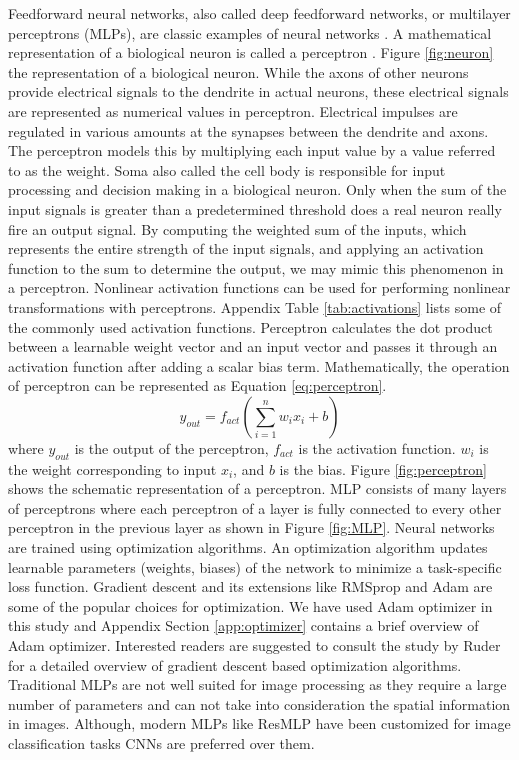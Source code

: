 Feedforward neural networks, also called deep feedforward networks, or multilayer perceptrons (MLPs), are classic examples of neural networks \cite{Goodfellow-et-al-2016}. A mathematical representation of a biological neuron is called a perceptron \cite{mcculloch1943logical}. Figure \ref{fig:neuron} the representation of a biological neuron. While the axons of other neurons provide electrical signals to the dendrite in actual neurons, these electrical signals are represented as numerical values in perceptron. Electrical impulses are regulated in various amounts at the synapses between the dendrite and axons. The perceptron models this by multiplying each input value by a value referred to as the weight. Soma also called the cell body is responsible for input processing and decision making in a biological neuron. Only when the sum of the input signals is greater than a predetermined threshold does a real neuron really fire an output signal. By computing the weighted sum of the inputs, which represents the entire strength of the input signals, and applying an activation function to the sum to determine the output, we may mimic this phenomenon in a perceptron. Nonlinear activation functions can be used for performing nonlinear transformations with perceptrons. Appendix Table \ref{tab:activations} lists some of the commonly used activation functions. Perceptron calculates the dot product between a learnable weight vector and an input vector and passes it through an activation function after adding a scalar bias term. Mathematically, the operation of perceptron can be represented as Equation \ref{eq:perceptron}.
\begin{equation}\label{eq:perceptron}
	y_{out}=f_{act}(\sum_{i=1}^{n}w_ix_i+b)
\end{equation} 
where $y_{out}$ is the output of the perceptron, $f_{act}$ is the activation function. $w_i$ is the weight corresponding to input $x_i$, and $b$ is the bias. Figure \ref{fig:perceptron} shows the schematic representation of a perceptron. MLP consists of many layers of perceptrons where each perceptron of a layer is fully connected to every other perceptron in the previous layer as shown in Figure \ref{fig:MLP}. Neural networks are trained using optimization algorithms. An optimization algorithm updates learnable parameters (weights, biases) of the network to minimize a task-specific loss function. Gradient descent \cite{Ruder2016} and its extensions like RMSprop \cite{tieleman2012lecture} and Adam \cite{Kingma2015} are some of the popular choices for optimization. We have used Adam optimizer in this study and Appendix Section \ref{app:optimizer} contains a brief overview of Adam optimizer. Interested readers are suggested to consult the study by Ruder \cite{Ruder2019Neural} for a detailed overview of gradient descent based optimization algorithms. Traditional MLPs are not well suited for image processing as they require a large number of parameters and can not take into consideration the spatial information in images. Although, modern MLPs like ResMLP \cite{touvron2022resmlp} have been customized for image classification tasks CNNs are preferred over them.


